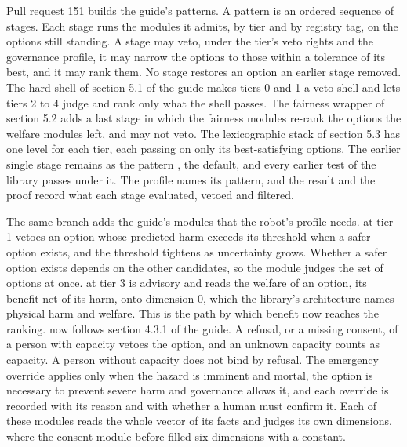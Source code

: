 Pull request 151 builds the guide's patterns.
A pattern is an ordered sequence of stages.
Each stage runs the modules it admits, by tier and by registry tag, on the options still standing.
A stage may veto, under the tier's veto rights and the governance profile, it may narrow the options
to those within a tolerance of its best, and it may rank them.
No stage restores an option an earlier stage removed.
The hard shell of section 5.1 of the guide makes tiers 0 and 1 a veto shell and lets tiers 2 to 4
judge and rank only what the shell passes.
The fairness wrapper of section 5.2 adds a last stage in which the fairness modules re-rank the
options the welfare modules left, and may not veto.
The lexicographic stack of section 5.3 has one level for each tier, each passing on only its
best-satisfying options.
The earlier single stage remains as the pattern , the default, and every earlier test of
the library passes under it.
The profile names its pattern, and the result and the proof record what each stage evaluated,
vetoed and filtered.

The same branch adds the guide's modules that the robot's profile needs.
 at tier 1 vetoes an option whose predicted harm exceeds its threshold
when a safer option exists, and the threshold tightens as uncertainty grows.
Whether a safer option exists depends on the other candidates, so the module judges the set of
options at once.
 at tier 3 is advisory and reads the welfare of an option, its benefit net of
its harm, onto dimension 0, which the library's architecture names physical harm and welfare.
This is the path by which benefit now reaches the ranking.
 now follows section 4.3.1 of the guide.
A refusal, or a missing consent, of a person with capacity vetoes the option, and an unknown capacity
counts as capacity.
A person without capacity does not bind by refusal.
The emergency override applies only when the hazard is imminent and mortal, the option is necessary
to prevent severe harm and governance allows it, and each override is recorded with its reason and
with whether a human must confirm it.
Each of these modules reads the whole vector of its facts and judges its own dimensions, where the
consent module before filled six dimensions with a constant.

